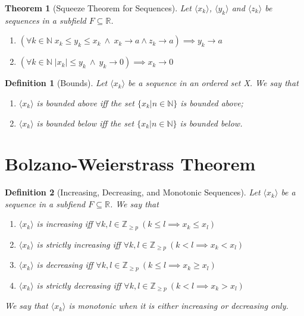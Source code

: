 \documentclass[11pt, oneside]{book}
\theoremstyle{break}
\newtheorem{thm}{Theorem}[section]
\newtheorem{defn}{Definition}[section]
\newcommand{\bb}[1]{\mathbb{#1}}		%
\begin{document}
\begin{thm}[Squeeze Theorem for Sequences]
	Let $\langle x_k \rangle$, $\langle y_k \rangle$ and $\langle z_k \rangle$ be sequences in a subfield $F \subseteq \bb{R}$.
	\begin{enumerate}
		\item $(\forall k \in \bb{N} \; x_k \leq y_k \leq x_k \> \land \> x_k \to a \land z_k \to a) \implies y_k \to a$
		\item $(\forall k \in \bb{N} \; |x_k| \leq y_k \> \land \> y_k \to 0) \implies x_k \to 0$
	\end{enumerate}
\end{thm}

\begin{defn}[Bounds]
	Let $\langle x_k \rangle$ be a sequence in an ordered set X. We say that
	\begin{enumerate}
		\item $\langle x_k \rangle$ is bounded above iff the set $\{x_k | n \in \bb{N} \}$ is bounded above;
		\item $\langle x_k \rangle$ is bounded below iff the set $\{x_k | n \in \bb{N} \}$ is bounded below.
	\end{enumerate}
\end{defn}


\section{Bolzano-Weierstrass Theorem}

\begin{defn}[Increasing, Decreasing, and Monotonic Sequences]
	Let $\langle x_k \rangle$ be a sequence in a subfiend $F \subseteq \bb{R}$. We say that
	\begin{enumerate}
		\item $\langle x_k \rangle$ is increasing iff $\forall k, l \in \bb{Z}_{\geq p} \> (k \leq l \implies x_k \leq x_l)$
		\item $\langle x_k \rangle$ is strictly increasing iff $\forall k, l \in \bb{Z}_{\geq p} \> (k < l \implies x_k < x_l)$
		\item $\langle x_k \rangle$ is decreasing iff $\forall k, l \in \bb{Z}_{\geq p} \> (k \leq l \implies x_k \geq x_l)$
		\item $\langle x_k \rangle$ is strictly decreasing iff $\forall k, l \in \bb{Z}_{\geq p} \> (k < l \implies x_k > x_l)$
	\end{enumerate}
	We say that $\langle x_k \rangle$ is monotonic when it is either increasing or decreasing only.
\end{defn}
\end{document}
